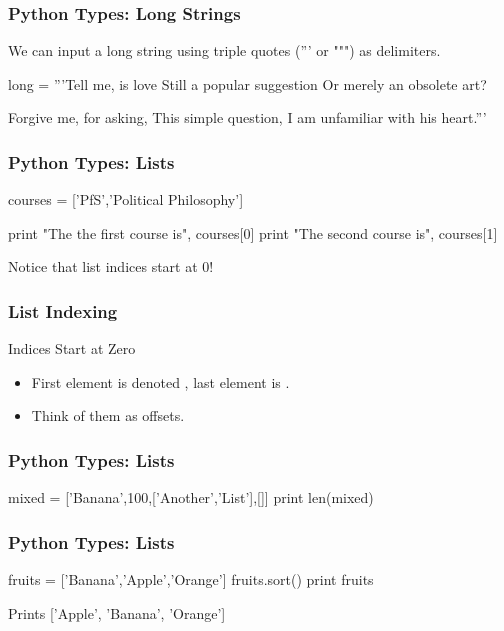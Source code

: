 \begin{frame}[fragile]
\frametitle{Python Types: Long Strings}

We can input a long string using triple quotes (''' or """) as delimiters.

\begin{python}
long = '''Tell me, is love
Still a popular suggestion
Or merely an obsolete art?

Forgive me, for asking,
This simple question,
I am unfamiliar with his heart.'''
\end{python}
\end{frame}

\begin{frame}[fragile]
\frametitle{Python Types: Lists}
\begin{python}
courses = ['PfS','Political Philosophy']

print "The the first course is", courses[0]
print "The second course is", courses[1]

\end{python}

Notice that list indices start at \alert{0}!

\end{frame}

\begin{frame}[fragile]
\frametitle{List Indexing}
\begin{block}{Indices Start at Zero}
\begin{itemize}
\item First element is denoted , last element is .
\item Think of them as \alert{offsets}.
\end{itemize}
\end{block}
\end{frame}


\begin{frame}[fragile]
\frametitle{Python Types: Lists}

\begin{python}
mixed = ['Banana',100,['Another','List'],[]]
print len(mixed)
\end{python}

\end{frame}

\begin{frame}[fragile]
\frametitle{Python Types: Lists}

\begin{python}
fruits = ['Banana','Apple','Orange']
fruits.sort()
print fruits
\end{python}

Prints ['Apple', 'Banana', 'Orange']

\end{frame}

